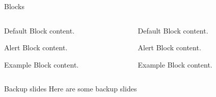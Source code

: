 \begin{frame}{Blocks}
  \begin{columns}
    \begin{column}{0.45\textwidth}
      \begin{block}{Default}
        Block content.
      \end{block}

      \begin{alertblock}{Alert}
        Block content.
      \end{alertblock}

      \begin{exampleblock}{Example}
        Block content.
      \end{exampleblock}
    \end{column}
    \begin{column}{0.45\textwidth}
      {

        \begin{block}{Default}
          Block content.
        \end{block}

        \begin{alertblock}{Alert}
          Block content.
        \end{alertblock}

        \begin{exampleblock}{Example}
          Block content.
        \end{exampleblock}
      }
    \end{column}
  \end{columns}

\end{frame}

\appendix

\begin{frame}{Backup slides}
  Here are some backup slides
\end{frame}

\vfil\break
\END


